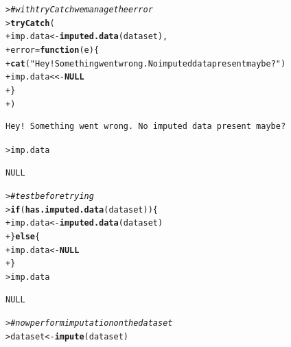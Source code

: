 \documentclass{article}\usepackage[]{graphicx}\usepackage[]{color}
\makeatletter
\newcommand{\hlstr}[1]{\textcolor[rgb]{0.192,0.494,0.8}{#1}}%
\newcommand{\hlcom}[1]{\textcolor[rgb]{0.678,0.584,0.686}{\textit{#1}}}%
\newcommand{\hlstd}[1]{\textcolor[rgb]{0.345,0.345,0.345}{#1}}%
\newcommand{\hlkwa}[1]{\textcolor[rgb]{0.161,0.373,0.58}{\textbf{#1}}}%
\newcommand{\hlkwb}[1]{\textcolor[rgb]{0.69,0.353,0.396}{#1}}%
\newcommand{\hlkwc}[1]{\textcolor[rgb]{0.333,0.667,0.333}{#1}}%
\newcommand{\hlkwd}[1]{\textcolor[rgb]{0.737,0.353,0.396}{\textbf{#1}}}%
\newenvironment{kframe}{%
 \def\at@end@of@kframe{}%
 \ifinner\ifhmode%
  \def\at@end@of@kframe{\end{minipage}}%
  \begin{minipage}{\columnwidth}%
 \fi\fi%
 \def\FrameCommand##1{\hskip\@totalleftmargin \hskip-\fboxsep
 \colorbox{shadecolor}{##1}\hskip-\fboxsep
     \hskip-\linewidth \hskip-\@totalleftmargin \hskip\columnwidth}%
 \MakeFramed {\advance\hsize-\width
   \@totalleftmargin\z@ \linewidth\hsize
   \@setminipage}}%
 {\par\unskip\endMakeFramed%
 \at@end@of@kframe}
\newenvironment{knitrout}{}{} %
\makeatother
\begin{document}
\begin{knitrout}
\begin{kframe}
{\ttfamily\noindent\bfseries\color{errorcolor}{Error in imputed.data(dataset): The dataset contains no imputed data. Please impute data before learning.\\See > ?impute for help.}}\begin{alltt}
\hlstd{> }\hlcom{# with tryCatch we manage the error}
\hlstd{> }\hlkwd{tryCatch}\hlstd{(}
\hlstd{+ }  \hlstd{imp.data} \hlkwb{<-} \hlkwd{imputed.data}\hlstd{(dataset),}
\hlstd{+ }  \hlkwc{error} \hlstd{=} \hlkwa{function}\hlstd{(}\hlkwc{e}\hlstd{) \{}
\hlstd{+ }    \hlkwd{cat}\hlstd{(}\hlstr{"Hey! Something went wrong. No imputed data present maybe?"}\hlstd{)}
\hlstd{+ }    \hlstd{imp.data} \hlkwb{<<-} \hlkwa{NULL}
\hlstd{+ }  \hlstd{\}}
\hlstd{+ }\hlstd{)}
\end{alltt}
\begin{verbatim}
Hey! Something went wrong. No imputed data present maybe?
\end{verbatim}
\begin{alltt}
\hlstd{> }\hlstd{imp.data}
\end{alltt}
\begin{verbatim}
NULL
\end{verbatim}
\begin{alltt}
\hlstd{> }\hlcom{# test before trying}
\hlstd{> }\hlkwa{if} \hlstd{(}\hlkwd{has.imputed.data}\hlstd{(dataset)) \{}
\hlstd{+ }  \hlstd{imp.data} \hlkwb{<-} \hlkwd{imputed.data}\hlstd{(dataset)}
\hlstd{+ }\hlstd{\}} \hlkwa{else} \hlstd{\{}
\hlstd{+ }  \hlstd{imp.data} \hlkwb{<-} \hlkwa{NULL}
\hlstd{+ }\hlstd{\}}
\hlstd{> }\hlstd{imp.data}
\end{alltt}
\begin{verbatim}
NULL
\end{verbatim}
\begin{alltt}
\hlstd{> }\hlcom{# now perform imputation on the dataset}
\hlstd{> }\hlstd{dataset} \hlkwb{<-} \hlkwd{impute}\hlstd{(dataset)}
\end{alltt}



\end{kframe}
\end{knitrout}
\end{document}
